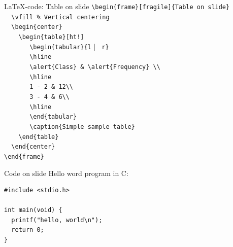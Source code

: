 \documentclass[t,11pt]{beamer}
\begin{document}
\toggleslidecolors
\begin{frame}[fragile]{\LaTeX-code: Table on slide}
\footnotesize
\verb|\begin{frame}[fragile]{Table on slide}|\\
\verb|  \vfill % Vertical centering|\\
\verb|  \begin{center}|\\
\verb|    \begin{table}[ht!]|\\
\verb|       \begin{tabular}{l| $|$ \verb| r}|\\
\verb|       \hline|\\
\verb|       \alert{Class} & \alert{Frequency} \\ |\\
\verb|       \hline|\\
\verb|       1 - 2 & 12\\|\\
\verb|       3 - 4 & 6\\|\\
\verb|       \hline|\\
\verb|       \end{tabular}|\\
\verb|       \caption{Simple sample table}|\\
\verb|    \end{table}|\\
\verb|  \end{center}|\\
\verb|\end{frame}|\\
\end{frame}
\toggleslidecolors


\begin{frame}[fragile]{Code on slide}
\alert{Hello word program in C:}
\begin{lstlisting}
#include <stdio.h>
 
int main(void) {
  printf("hello, world\n");
  return 0;
}
\end{lstlisting}
\end{frame}
\end{document}
